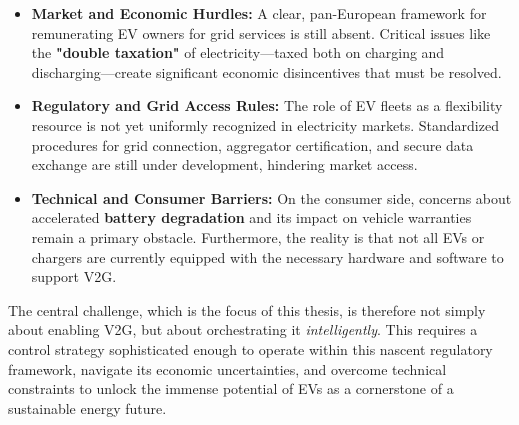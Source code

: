 \begin{itemize}
    \item \textbf{Market and Economic Hurdles:} A clear, pan-European framework for remunerating EV owners for grid services is still absent. Critical issues like the \textbf{"double taxation"} of electricity—taxed both on charging and discharging—create significant economic disincentives that must be resolved.
    \item \textbf{Regulatory and Grid Access Rules:} The role of EV fleets as a flexibility resource is not yet uniformly recognized in electricity markets. Standardized procedures for grid connection, aggregator certification, and secure data exchange are still under development, hindering market access.
    \item \textbf{Technical and Consumer Barriers:} On the consumer side, concerns about accelerated \textbf{battery degradation} and its impact on vehicle warranties remain a primary obstacle. Furthermore, the reality is that not all EVs or chargers are currently equipped with the necessary hardware and software to support V2G.
\end{itemize}
The central challenge, which is the focus of this thesis, is therefore not simply about enabling V2G, but about orchestrating it \textit{intelligently}. This requires a control strategy sophisticated enough to operate within this nascent regulatory framework, navigate its economic uncertainties, and overcome technical constraints to unlock the immense potential of EVs as a cornerstone of a sustainable energy future.

